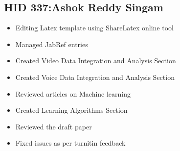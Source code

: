 \documentclass[sigconf]{acmart}
\begin{document}
\subsection{HID 337:Ashok Reddy Singam}
\begin{itemize}
  \item Editing Latex template using ShareLatex online tool
  \item Managed JabRef entries 
  \item Created Video Data Integration and Analysis Section
  \item Created Voice Data Integration and Analysis Section
  \item Reviewed articles on Machine learning 
  \item Created Learning Algorithms Section 
  \item Reviewed the draft paper 
  \item Fixed issues as per turnitin feedback
\end{itemize}
\end{document}

